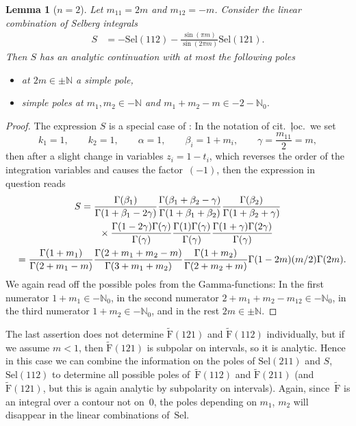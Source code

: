 \documentclass[pdftex]{sigma}%
\numberwithin{equation}{section}
\newtheorem{lem}[teo]{Lemma}
\newcommand{\N}{\mathbb{N}}
\newcommand{\Sel}{\mathrm{Sel}}
\newcommand{\rFp}{\tilde{\mathrm{F}}}
\begin{document}
\begin{lem}[$n=2$]
 	Let $m_{11}=2m$ and $m_{12}=-m$. Consider the linear combination of Selberg integrals
	\begin{align*}
	S&=-\Sel(112)-\frac{\sin(\pi m)}{\sin(2\pi m)}\Sel(121).
	\end{align*}
	Then $S$ has an analytic continuation with at most the following poles
	\begin{itemize}\itemsep=0pt
		\item at $2m\in\pm\N$ a simple pole,
		\item simple poles at $m_1,m_2\in-\N$ and $m_1+m_2-m\in-2-\N_0$.
	\end{itemize}
\end{lem}
\begin{proof}
	The expression $S$ is a special case of \cite[Theorem~1.2]{War09}: In the notation of cit.~ļoc.~we set
\[k_1=1,\qquad k_2=1,\qquad \alpha=1,\qquad \beta_i=1+m_i,\qquad \gamma=\frac{m_{11}}{2}=m,\]
	then after a slight change in variables $z_i=1-t_i$, which reverses the order of the integration variables and causes the factor~$(-1)$, then the expression in question reads
	\begin{gather*}
	S =
	\frac{\Gamma(\beta_1)}{\Gamma(1+\beta_1-2\gamma)}
	\frac{\Gamma(\beta_1+\beta_2-\gamma)}{\Gamma(1+\beta_1+\beta_2)}
	\frac{\Gamma(\beta_2)}{\Gamma(1+\beta_2+\gamma)}\\
\hphantom{S=}{}\times
	\frac{\Gamma(1-2\gamma)\Gamma(\gamma)}{\Gamma(\gamma)}
	\frac{\Gamma(1)\Gamma(\gamma)}{\Gamma(\gamma)}
	\frac{\Gamma(1+\gamma)\Gamma(2\gamma)}{\Gamma(\gamma)}\\
\hphantom{S}{}
=
	\frac{\Gamma(1+m_1)}{\Gamma(2+m_1-m)}
	\frac{\Gamma(2+m_1+m_2-m)}{\Gamma(3+m_1+m_2)}
	\frac{\Gamma(1+m_2)}{\Gamma(2+m_2+m)}
	\Gamma(1-2m)(m/2)\Gamma(2m).
	\end{gather*}
	We again read off the possible poles from the Gamma-functions: In the first numerator $1+m_1\in-\N_0$, in the second numerator $2+m_1+m_2-m_{12}\in-\N_0$, in the third numerator $1+m_2\in-\N_0$, and in the rest $2m\in\pm\N$.
\end{proof}

The last assertion does not determine $\rFp(121)$ and $\rFp(112)$ individually, but if we assume $m<1$, then $\rFp(121)$ is subpolar on intervals, so it is analytic. Hence in this case we can combine the information on the poles of $\Sel(211)$ and $S$, $\Sel(112)$ to determine all possible poles of~$\rFp(112)$ and $\rFp(211)$ (and~$\rFp(121)$, but this is again analytic by subpolarity on intervals). Again, since~$\rFp$ is an integral over a contour not on~$0$, the poles depending on $m_1$, $m_2$ will disappear in the linear combinations of~$\Sel$.
\end{document}

